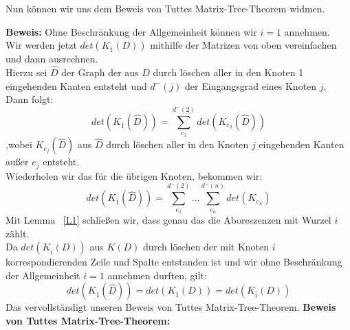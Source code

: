 Nun können wir uns dem Beweis von Tuttes Matrix-Tree-Theorem widmen.

\textbf{Beweis:}
Ohne Beschränkung der Allgemeinheit können wir $i=1$ annehmen.\\
Wir werden jetzt $det(K_{\bar{1}}(D))$ mithilfe der Matrizen von oben vereinfachen und dann ausrechnen.\\
Hierzu sei $\hat{D}$ der Graph der aus $D$ durch löschen aller in den Knoten 1 eingehenden Kanten entsteht und $d^{-}(j)$ der Eingangsgrad eines Knoten $j$. Dann folgt:
\begin{equation}
 det(K_{\bar{1}}(\hat{D})) = \sum_{e_2}^{d^{-}(2)}det(K_{e_2}(\hat{D}))
\end{equation}
,wobei $K_{e_j}(\hat{D})$ aus $\hat{D}$ durch löschen aller in den Knoten $j$ eingehenden Kanten außer $e_j$ entsteht.\\
Wiederholen wir das für die übrigen Knoten, bekommen wir:
\begin{equation}
  det(K_{\bar{1}}(\hat{D})) = \sum_{e_2}^{d^{-}(2)}...\sum_{e_n}^{d^{-}(n)}det(K_{e_n})
\end{equation}
Mit Lemma ~\ref{L1} schließen wir, dass genau das die Aboreszenzen mit Wurzel $i$ zählt.\\
Da $det(K_{\bar{i}}(D))$ aus $K(D)$ durch löschen der mit Knoten $i$ korrespondierenden Zeile und Spalte entstanden ist und wir ohne Beschränkung der Allgemeinheit $i=1$ annehmen durften, gilt:
\begin{equation}
 det(K_{\bar{1}}(\hat{D}))=det(K_{\bar{1}}(D))=det(K_{\bar{i}}(D))
\end{equation}
Das vervollständigt unseren Beweis von Tuttes Matrix-Tree-Theorem.
\textbf{Beweis von Tuttes Matrix-Tree-Theorem:}
